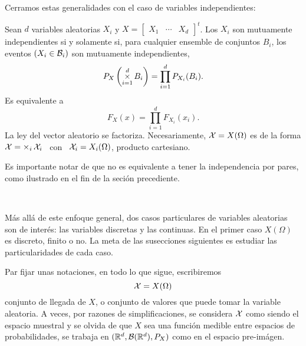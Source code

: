 Cerramos estas generalidades con el caso de variables independientes:
%
\begin{definicion}[Independencia]
\label{Def:MP:Independencia}
%
  Sean $d$  variables aleatorias  $X_i$ y  $X = \begin{bmatrix}  X_1 &  \cdots &
    X_d  \end{bmatrix}^t$.   Los  $X_i$   son  mutuamente  independientes  si  y
  solamente si,  para cualquier ensemble  de conjuntos $B_i$, los  eventos $(X_i
  \in \mathcal{B}_i)$ son mutuamente independientes, \ie
  \[
  P_X\left( \operatorname*{\times}_{i=1}^d B_i \right) = \prod_{i=1}^d P_{X_i}(B_i).
  \]
  Es equivalente a
  \[
  F_X(x) = \prod_{i=1}^d F_{X_i}(x_i).
  \]
  La ley del vector aleatorio se factoriza.  Necesariamente, $\mathcal{X} = X(\Omega)$ es
  de la  forma $\mathcal{X}  = \operatorname*{\times}_i \mathcal{X}_i$  \ con  \ $\mathcal{X}_i =  X_i(\Omega)$, producto
  cartesiano.
\end{definicion}
%
\noindent Es importante notar de que  no es equivalente a tener la independencia
por pares, como ilustrado en el fin de la seci\'on precediente.

\

M\'as  all\'a de  este  enfoque  general, dos  casos  particulares de  variables
aleatorias son  de inter\'es:  las variables discretas  y las continuas.   En el
primer caso  $X(\Omega)$ es discreto, finito  o no.  La meta  de las susecciones
siguientes es estudiar las particularidades de cada caso.

Par fijar unas notaciones, en todo lo que sigue, escribiremos
%
\[
\mathcal{X} = X(\Omega)
\]
%
conjunto de  llegada de $X$, o conjunto  de valores que puede  tomar la variable
aleatoria.  A  veces, por  razones de simplificaciones,  se considera  $\mathcal{X}$ como
siendo el  espacio muestral  y se olvida  de que  $X$ sea una  funci\'on medible
entre espacios de probabilidades,  \ie se trabaja en $(\mathbb{R}^d,\mathcal{B}(\mathbb{R}^d),P_X)$
como en el espacio pre-im\'agen.




\label{Ssec:MP:VADiscreta}

